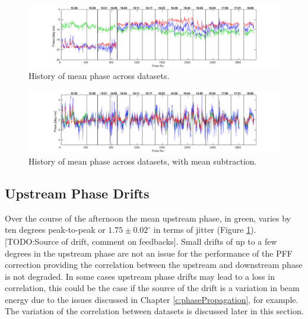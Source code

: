 \begin{landscape}

\begin{figure}
  \centering
  \includegraphics[width=\hsize]{Figures/feedforward/longFF_noMeanSubHistory}
  \caption{History of mean phase across datasets.}
  \label{f:longFF_noMeanSubHistory}
\end{figure}


\begin{figure}
  \centering
  \includegraphics[width=\hsize]{Figures/feedforward/longFF_history}
  \caption{History of mean phase across datasets, with mean subtraction.}
  \label{f:longFF_history}
\end{figure}

\end{landscape}

\subsection{Upstream Phase Drifts}
\label{ss:longFF_upDrifts}

Over the course of the afternoon the mean upstream phase, in green, varies by ten degrees peak-to-peak or \(1.75 \pm 0.02^\circ\) in terms of jitter (Figure \ref{f:longFF_noMeanSubHistory}). [TODO:Source of drift, comment on feedbacks]. Small drifts of up to a few degrees in the upstream phase are not an issue for the performance of the PFF correction providing the correlation between the upstream and downstream phase is not degraded. In some cases upstream phase drifts may lead to a loss in correlation, this could be the case if the source of the drift is a variation in beam energy due to the issues discussed in Chapter \ref{c:phasePropagation}, for example. The variation of the correlation between datasets is discussed later in this section.

